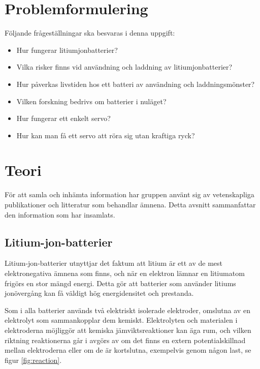 \documentclass[a4paper,12pt]{article}
\begin{document}
\section{Problemformulering}
Följande frågeställningar ska besvaras i denna uppgift:
\begin{itemize}
\item Hur fungerar litiumjonbatterier?

\item Vilka risker finns vid användning och laddning av litiumjonbatterier?

\item Hur påverkas livstiden hos ett batteri av användning och laddningsmönster?

\item Vilken forskning bedrivs om batterier i nuläget?

\item Hur fungerar ett enkelt servo?

\item Hur kan man få ett servo att röra sig utan kraftiga ryck?
\end{itemize}
\section{Teori}
För att samla och inhämta information har gruppen använt sig av vetenskapliga publikationer och litteratur som behandlar ämnena. Detta avsnitt sammanfattar den information som har insamlats.

\subsection{Litium-jon-batterier}
Litium-jon-batterier utnyttjar det faktum att litium är ett av de mest elektronegativa ämnena som finns, och när en elektron lämnar en litiumatom frigörs en stor mängd energi. Detta gör att batterier som använder litiums jonövergång kan få väldigt hög energidensitet och prestanda.

Som i alla batterier används två elektriskt isolerade elektroder, omslutna av en elektrolyt som sammankopplar dem kemiskt. Elektrolyten och materialen i elektroderna möjliggör att kemiska jämviktsreaktioner kan äga rum, och vilken riktning reaktionerna går i avgörs av om det finns en extern potentialskillnad mellan elektroderna eller om de är kortslutna, exempelvis genom någon last, se figur \ref{fig:reaction}. \cite{glaize13}

\end{document}
